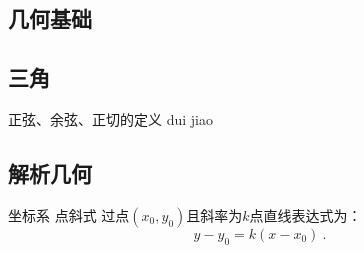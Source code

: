 
\begin{issues}
\issueDraft
\end{issues}

\subsection{几何基础}

\subsection{三角}
正弦、余弦、正切的定义
dui jiao

\subsection{解析几何}
坐标系
点斜式
过点$(x_0,y_0)$且斜率为$k$点直线表达式为：
\begin{equation}
y-y_0=k(x-x_0)~.
\end{equation}
